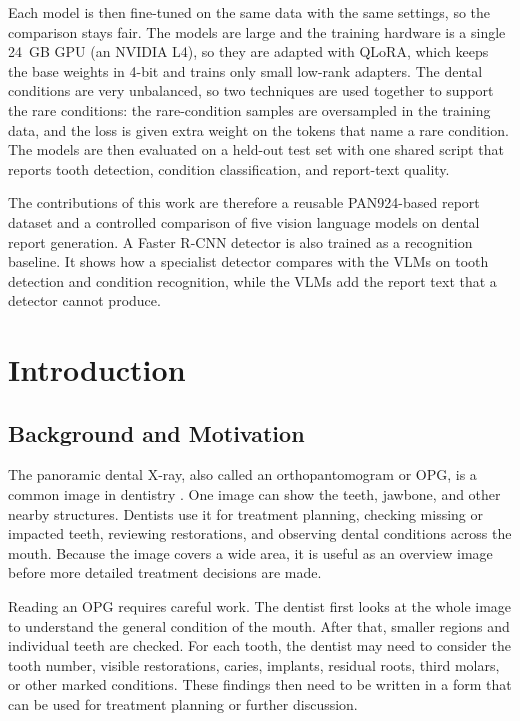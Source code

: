 \documentclass[a4paper,12pt]{report}
\begin{document}
Each model is then fine-tuned on the same data with the same settings, so the comparison stays fair. The models are large and the training hardware is a single 24~GB GPU (an NVIDIA L4), so they are adapted with QLoRA, which keeps the base weights in 4-bit and trains only small low-rank adapters. The dental conditions are very unbalanced, so two techniques are used together to support the rare conditions: the rare-condition samples are oversampled in the training data, and the loss is given extra weight on the tokens that name a rare condition. The models are then evaluated on a held-out test set with one shared script that reports tooth detection, condition classification, and report-text quality.

The contributions of this work are therefore a reusable PAN924-based report dataset and a controlled comparison of five vision language models on dental report generation. A Faster R-CNN detector is also trained as a recognition baseline. It shows how a specialist detector compares with the VLMs on tooth detection and condition recognition, while the VLMs add the report text that a detector cannot produce.
 

\vspace{1cm}


\newpage



\tableofcontents
\newpage
\listoffigures
\newpage
\listoftables
\newpage



\setcounter{page}{1}
\chapter{Introduction}
\section{Background and Motivation}
The panoramic dental X-ray, also called an orthopantomogram or OPG, is a common image in dentistry \cite{inredd_pan924_2025}. One image can show the teeth, jawbone, and other nearby structures. Dentists use it for treatment planning, checking missing or impacted teeth, reviewing restorations, and observing dental conditions across the mouth. Because the image covers a wide area, it is useful as an overview image before more detailed treatment decisions are made.

Reading an OPG requires careful work. The dentist first looks at the whole image to understand the general condition of the mouth. After that, smaller regions and individual teeth are checked. For each tooth, the dentist may need to consider the tooth number, visible restorations, caries, implants, residual roots, third molars, or other marked conditions. These findings then need to be written in a form that can be used for treatment planning or further discussion.
\end{document}
